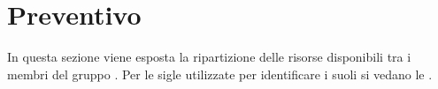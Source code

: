 \section{Preventivo}
In questa sezione viene esposta la ripartizione delle risorse disponibili tra i membri del gruppo \Gruppo{}. Per le sigle utilizzate per identificare i suoli si vedano le \NdPv{}.




